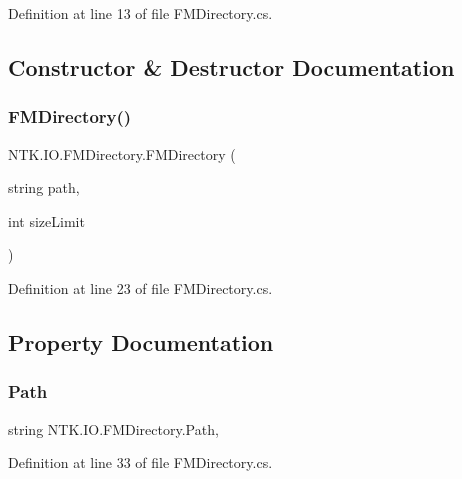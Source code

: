 Definition at line 13 of file F\+M\+Directory.\+cs.



\subsection{Constructor \& Destructor Documentation}
\mbox{\label{class_n_t_k_1_1_i_o_1_1_f_m_directory_a3ccd7f230287b70755f76961cf63abd0}} 
\subsubsection{\texorpdfstring{FMDirectory()}{FMDirectory()}}
{\footnotesize\ttfamily N\+T\+K.\+I\+O.\+F\+M\+Directory.\+F\+M\+Directory (\begin{DoxyParamCaption}\item[{string}]{path,  }\item[{int}]{size\+Limit }\end{DoxyParamCaption})}



Definition at line 23 of file F\+M\+Directory.\+cs.



\subsection{Property Documentation}
\mbox{\label{class_n_t_k_1_1_i_o_1_1_f_m_directory_a5d12c47469328064bbdf5a0fc1fbbe3d}} 
\subsubsection{\texorpdfstring{Path}{Path}}
{\footnotesize\ttfamily string N\+T\+K.\+I\+O.\+F\+M\+Directory.\+Path\hspace{0.3cm}{\ttfamily [get]}, {\ttfamily [set]}}



Definition at line 33 of file F\+M\+Directory.\+cs.

\mbox{\label{class_n_t_k_1_1_i_o_1_1_f_m_directory_af579e225097ee830866581a00a406400}} 
